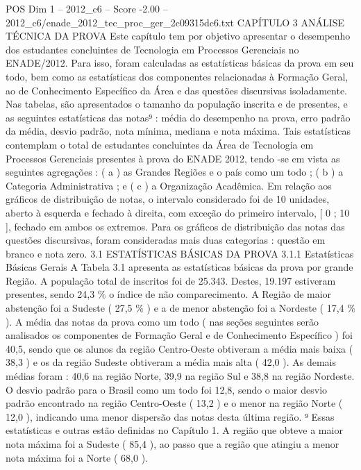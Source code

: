 \begin{textsample}{POS Dim 1 – 2012\_c6 – Score -2.00 – 2012\_c6/enade\_2012\_tec\_proc\_ger\_2c09315dc6.txt}  \label{ex:f1_pos_190}
CAPÍTULO 3 ANÁLISE TÉCNICA DA PROVA Este capítulo tem por objetivo apresentar o desempenho dos estudantes concluintes de Tecnologia em Processos Gerenciais no ENADE/2012.
Para isso, foram calculadas as estatísticas básicas da prova em seu todo, bem como as estatísticas dos componentes relacionadas à Formação Geral, ao de Conhecimento Específico da Área e das questões discursivas isoladamente.
Nas tabelas, são apresentados o tamanho da população inscrita e de presentes, e as seguintes estatísticas das notas⁹ : média do desempenho na prova, erro padrão da média, desvio padrão, nota mínima, mediana e nota máxima.
Tais estatísticas contemplam o total de estudantes concluintes da Área de Tecnologia em Processos Gerenciais presentes à prova do ENADE 2012, tendo -se em vista as seguintes agregações : ( a ) as Grandes Regiões e o país como um todo ; ( b ) a Categoria Administrativa ; e ( c ) a Organização Acadêmica.
Em relação aos gráficos de distribuição de notas, o intervalo considerado foi de 10 unidades, aberto à esquerda e fechado à direita, com exceção do primeiro intervalo, [ 0 ; 10 ], fechado em ambos os extremos.
Para os gráficos de distribuição das notas das questões discursivas, foram consideradas mais duas categorias : questão em branco e nota zero. 3.1 ESTATÍSTICAS BÁSICAS DA PROVA 3.1.1 Estatísticas Básicas Gerais A Tabela 3.1 apresenta as estatísticas básicas da prova por grande Região.
A população total de inscritos foi de 25.343.
Destes, 19.197 estiveram presentes, sendo 24,3 \% o índice de não comparecimento.
A Região de maior abstenção foi a Sudeste ( 27,5 \% ) e a de menor abstenção foi a Nordeste ( 17,4 \% ).
A média das notas da prova como um todo ( nas seções seguintes serão analisados os componentes de Formação Geral e de Conhecimento Específico ) foi 40,5, sendo que os alunos da região Centro-Oeste obtiveram a média mais baixa ( 38,3 ) e os da região Sudeste obtiveram a média mais alta ( 42,0 ).
As demais médias foram : 40,6 na região Norte, 39,9 na região Sul e 38,8 na região Nordeste.
O desvio padrão para o Brasil como um todo foi 12,8, sendo o maior desvio padrão encontrado na região Centro-Oeste ( 13,2 ) e o menor na região Norte ( 12,0 ), indicando uma menor dispersão das notas desta última região. ⁹ Essas estatísticas e outras estão definidas no Capítulo 1.
A região que obteve a maior nota máxima foi a Sudeste ( 85,4 ), ao passo que a região que atingiu a menor nota máxima foi a Norte ( 68,0 ).

\end{textsample}
